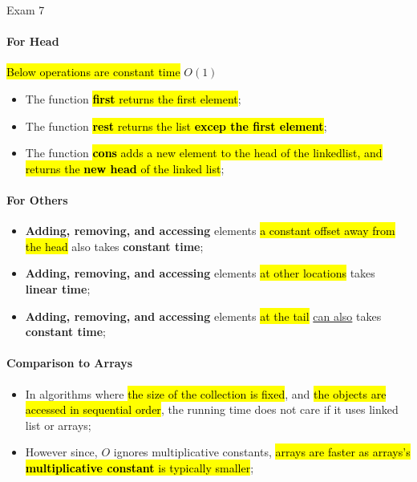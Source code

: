 \documentclass{note}
\begin{document}
\begin{note}{Exam 7}
        \paragraph{For Head}

        \hl{Below operations are constant time} $ O \left( 1 \right) $

        \begin{itemize}
            \item The function \hl{\textbf{first} returns the first element};
            \item The function \hl{\textbf{rest} returns the list \textbf{excep the first element}};
            \item The function \hl{\textbf{cons} adds a new element to the head of the linkedlist, and returns 
            the \textbf{new head} of the linked list};
        \end{itemize}

        \paragraph{For Others}

        \begin{itemize}
            \item \textbf{Adding, removing, and accessing} elements \hl{a constant offset away from the head} also takes
            \textbf{constant time};
            \item \textbf{Adding, removing, and accessing} elements \hl{at other locations} takes
            \textbf{linear time};
            \item \textbf{Adding, removing, and accessing} elements \hl{at the tail} \underline{can also} takes
            \textbf{constant time};
        \end{itemize}

        \paragraph{Comparison to Arrays}

        \begin{itemize}
            \item In algorithms where \hl{the size of the collection is fixed}, and \hl{the objects are accessed in sequential order},
            the running time does not care if it uses linked list or arrays;
            \item However since, $ O $ ignores multiplicative constants, \hl{arrays are faster as arrays's \textbf{multiplicative constant}
            is typically smaller};
        \end{itemize}


\end{note}
\end{document}
